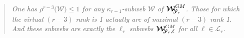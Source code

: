 \documentclass[11pt]{amsart}
\begin{document}
\begin{quote}%
{\it One has $\rho^{r-3}\big( \boldsymbol{\mathcal W}\big)\leq 1$ for any $\kappa_{r-1}$-subweb $\boldsymbol{\mathcal W}$ of $\boldsymbol{\mathcal W}_{\hspace{-0.1cm} \boldsymbol{\mathcal Y}_r}^{GM}$. Those 
for which the virtual $(r-3)$-rank is 1 actually are of maximal $(r-3)$-rank 1.  And these subwebs are exactly the $\ell_r$ subwebs 
$ \boldsymbol{\mathcal W}_{\hspace{-0.1cm} \boldsymbol{\mathcal Y}_r, \ell}^{GM}$ for all $\ell \in \boldsymbol{\mathcal L}_r$.} 
\end{quote}%

\end{document}
